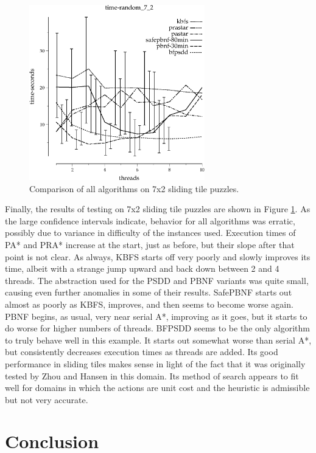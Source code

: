 \documentclass{article}
\begin{document}
\begin{figure}[h!]
\includegraphics[width=3in]{../graphs/seth/time-random_7_2.eps}
\caption{Comparison of all algorithms on 7x2 sliding tile puzzles.}
\label{fig:comp-tile}
\end{figure}

Finally, the results of testing on 7x2 sliding tile puzzles are shown in Figure \ref{fig:comp-tile}. As the large confidence intervals indicate, behavior for all algorithms was erratic, possibly due to variance in difficulty of the instances used. Execution times of PA* and PRA* increase at the start, just as before, but their slope after that point is not clear. As always, KBFS starts off very poorly and slowly improves its time, albeit with a strange jump upward and back down between 2 and 4 threads. The abstraction used for the PSDD and PBNF variants was quite small, causing even further anomalies in some of their results. SafePBNF starts out almost as poorly as KBFS, improves, and then seems to become worse again. PBNF begins, as usual, very near serial A*, improving as it goes, but it starts to do worse for higher numbers of threads. BFPSDD seems to be the only algorithm to truly behave well in this example. It starts out somewhat worse than serial A*, but consistently decreases execution times as threads are added. Its good performance in sliding tiles makes sense in light of the fact that it was originally tested by Zhou and Hansen in this domain. Its method of search appears to fit well for domains in which the actions are unit cost and the heuristic is admissible but not very accurate.
\section{Conclusion}
\end{document}
